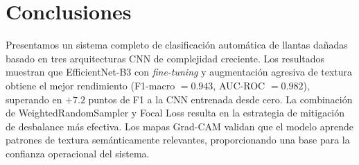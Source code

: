 \documentclass{article}
\begin{document}
\section{Conclusiones}
\label{sec:conclusions}

Presentamos un sistema completo de clasificación automática de llantas dañadas 
basado en tres arquitecturas CNN de complejidad creciente. Los resultados muestran 
que EfficientNet-B3 con \emph{fine-tuning} y augmentación agresiva de textura 
obtiene el mejor rendimiento (F1-macro $= 0.943$, AUC-ROC $= 0.982$), superando 
en $+7.2$ puntos de F1 a la CNN entrenada desde cero. La combinación de 
WeightedRandomSampler y Focal Loss resulta en la estrategia de mitigación de 
desbalance más efectiva. Los mapas Grad-CAM validan que el modelo aprende patrones 
de textura semánticamente relevantes, proporcionando una base para la confianza 
operacional del sistema.



\end{document}
